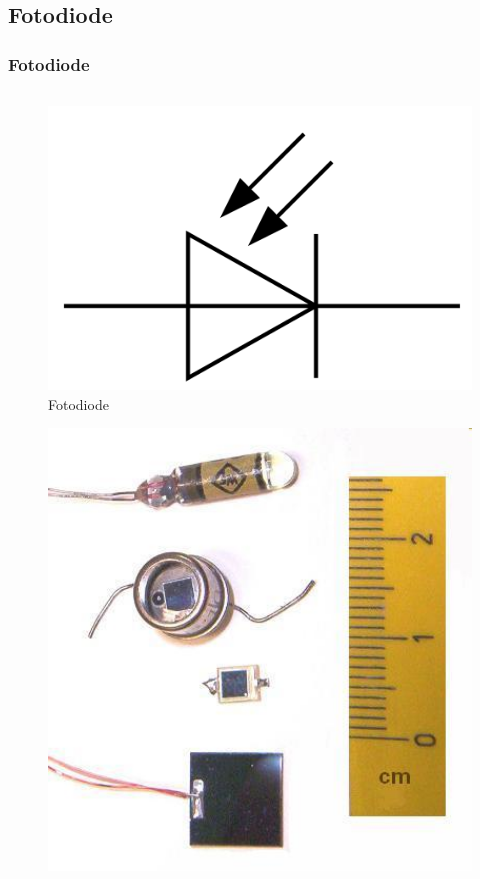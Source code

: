 \subsection*{Fotodiode}
\begin{frame}
  \frametitle{Fotodiode}
  \begin{columns}[c]
    \column[c]{4cm}
    \begin{center}
      \begin{figure}
        \includegraphics[width=1\textwidth,height=.25\textheight,keepaspectratio]{e12/Symbol_Photodiode.png}
        \caption{Fotodiode}
      \end{figure}
      \begin{figure}
        \includegraphics[width=1\textwidth,height=.25\textheight,keepaspectratio]{e12/Fotodio.jpg}

\end{figure}
\end{center}
\end{columns}
\end{frame}
